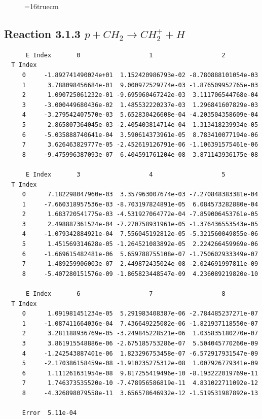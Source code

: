 \documentclass[12pt,dvipdfmx]{article}
\begin{document}
\begin{figure} \label{met.3_3.1.2}
\epsfxsize=16truecm
\end{figure}
\newpage


\subsection{
Reaction 3.1.3    $p + CH_2 \rightarrow CH_2^+ + H $
}


\begin{small}\begin{verbatim}
      E Index       0                   1                   2
  T Index
     0     -1.892741490024e+01  1.152420986793e-02 -8.780888101054e-03
     1      3.788098456684e-01  9.000972529774e-03 -1.876509952765e-03
     2      1.090725061232e-01 -9.695960467242e-03  3.111706544768e-04
     3     -3.000449680436e-02  1.485532220237e-03  1.296841607829e-03
     4     -3.279542407570e-03  5.652830426608e-04 -4.203504358609e-04
     5      2.865807364045e-03 -2.405403814714e-04  1.313418239934e-05
     6     -5.035888740641e-04  3.590614373961e-05  8.783410077194e-06
     7      3.626463829777e-05 -2.452619126791e-06 -1.106391575461e-06
     8     -9.475996387093e-07  6.404591761204e-08  3.871143936175e-08

      E Index       3                   4                   5
  T Index
     0      7.182298047960e-03  3.357963007674e-03 -7.270848383381e-04
     1     -7.660318957536e-03 -8.703197824891e-05  6.084573282880e-04
     2      1.683720541775e-03 -4.531927064772e-04 -7.859006453761e-05
     3      2.498887361524e-04 -7.270758931961e-05 -1.376436553543e-05
     4     -1.079342884921e-04  7.556045192812e-05 -5.321560049855e-06
     5      1.451569314628e-05 -1.264521083892e-05  2.224266459969e-06
     6     -1.669615482481e-06  5.659788755108e-07 -1.750602933349e-07
     7      1.489259906003e-07  2.449872435024e-08 -2.024691997811e-09
     8     -5.407280151576e-09 -1.865823448547e-09  4.236089219820e-10

      E Index       6                   7                   8
  T Index
     0      1.091981451234e-05  5.291983408387e-06 -2.784485237271e-07
     1     -1.087411664036e-04  7.436649225082e-06 -1.821937118550e-07
     2      3.281188936769e-05 -3.249845228521e-06  1.035835180270e-07
     3      3.861915548886e-06 -2.675185753286e-07  5.504045770260e-09
     4     -1.242543887401e-06  1.823296753458e-07 -6.572917931547e-09
     5     -2.170386158459e-08 -1.910235275312e-08  1.007926779341e-09
     6      1.111261631954e-08  9.817255419496e-10 -8.193222019769e-11
     7      1.746373535520e-10 -7.478956586819e-11  4.831022711092e-12
     8     -4.326898079558e-11  3.656578646932e-12 -1.519531987892e-13

     Error  5.11e-04
\end{verbatim}\end{small}
\end{document}
